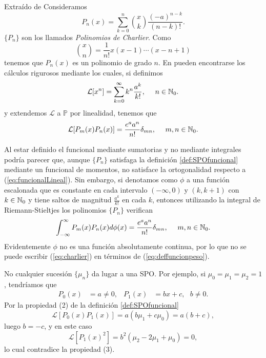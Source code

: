 \begin{ejemplo}
    \label{ej:charlier}
    Extraído de \cite[Capítulo 1, sección 1]{chihara}
    Consideramos 
    $$
    P_n(x) = \sum_{k=0}^n\binom{x}{k}\dfrac{(-a)^{n-k}}{(n-k)!}.
    $$
    $\{P_n\}$ son los llamados \textit{Polinomios de Charlier}. Como
    $$\binom{x}{n} = \dfrac 1 {n!} x(x-1)\cdots (x-n+1) 
    $$
    tenemos que $P_n(x)$ es un polinomio de grado $n$. En \cite{chihara} pueden encontrarse los cálculos rigurosos mediante los cuales, si definimos
    \begin{equation*}
        \label{eq:funcional-charlier}
    \mathcal{L}[x^n]=\sum_{k=0}^\infty k^n \dfrac{a^k}{k!}, \ \ \ \ n\in\N_0.
    \end{equation*}
    y extendemos $\mathcal{L}$ a $\mathbb{P}$ por linealidad, tenemos que 
    $$
        \mathcal{L}[P_m(x)P_n(x)] = \dfrac{e^a a^n}{n!}\delta_{mn}, \ \ \ \ m,n\in\mathbb{N}_0.
    $$

    Al estar definido el funcional mediante sumatorias y no mediante integrales podría parecer que, aunque $\{P_n\}$ satisfaga la definición \ref{def:SPOfuncional} mediante un funcional de momentos, no satisface la ortogonalidad respecto a (\ref{eq:funcionalLineal}). Sin embargo, si denotamos como $\phi$ a una función escalonada que es constante en cada intervalo $(-\infty,0)$ y $(k,k+1)$ con $k\in\mathbb{N}_0$ y tiene saltos de magnitud $\frac{a^k}{k!}$ en cada $k$, entonces utilizando la integral de Riemann-Stieltjes los polinomios $\{P_n\}$ verifican
    \begin{equation}
        \label{eq:charlier}
        \int_{-\infty}^\infty P_m(x)P_n(x) d\phi(x) = \dfrac{e^a a^n}{n!}\delta_{mn}, \ \ \ \ m,n\in\mathbb{N}_0.        
    \end{equation}
    Evidentemente $\phi$ no es una función absolutamente continua, por lo que no se puede escribir (\ref{eq:charlier}) en términos de (\ref{eq:deffuncionpeso}).
\end{ejemplo}

\begin{observacion}
    \label{observacion:existencia}
    No cualquier sucesión $\{\mu_n\}$ da lugar a una SPO. Por ejemplo, si $\mu_0=\mu_1=\mu_2=1$, tendríamos que
    \begin{align*}
        P_0(x)&=a\not=0, & P_1(x)&=bx+c, \ \ \ b\not=0.
    \end{align*}
    Por la propiedad (2) de la definición \ref{def:SPOfuncional}
    $$
    \mathcal{L}[P_0(x)P_1(x)] = a(b\mu_1 + c\mu_0)=a(b+c),
    $$
    luego $b=-c$, y en este caso
    $$
    \mathcal{L}[P_1(x)^2] = b^2(\mu_2-2\mu_1+\mu_0)=0,
    $$
    lo cual contradice la propiedad (3).
\end{observacion}

